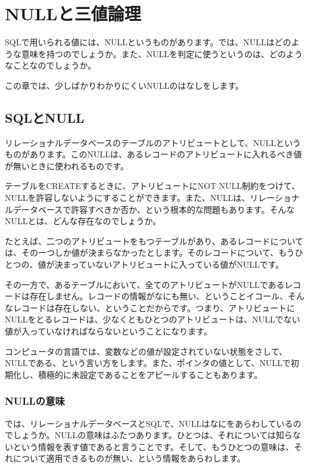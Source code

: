\chapter{NULLと三値論理}

SQLで用いられる値には、NULLというものがあります。では、NULLはどのような意味を持つのでしょうか。また、NULLを判定に使うというのは、どのようなことなのでしょうか。

この章では、少しばかりわかりにくいNULLのはなしをします。

\section{SQLとNULL}

リレーショナルデータベースのテーブルのアトリビュートとして、NULLというものがあります。このNULLは、あるレコードのアトリビュートに入れるべき値が無いときに使われるものです。

テーブルをCREATEするときに、アトリビュートにNOT NULL制約をつけて、NULLを許容しないようにすることができます。また、NULLは、リレーショナルデータベースで許容すべきか否か、という根本的な問題もあります。そんなNULLとは、どんな存在なのでしょうか。

たとえば、二つのアトリビュートをもつテーブルがあり、あるレコードについては、その一つしか値が決まらなかったとします。そのレコードについて、もうひとつの、値が決まっていないアトリビュートに入っている値がNULLです。

その一方で、あるテーブルにおいて、全てのアトリビュートがNULLであるレコードは存在しません。レコードの情報がなにも無い、ということイコール、そんなレコードは存在しない、ということだからです。つまり、アトリビュートにNULLをとるレコードは、少なくともひとつのアトリビュートは、NULLでない値が入っていなければならないということになります。

コンピュータの言語では、変数などの値が設定されていない状態をさして、NULLである、という言い方をします。また、ポインタの値として、NULLで初期化し、積極的に未設定であることをアピールすることもあります。




\subsection{NULLの意味}

では、リレーショナルデータベースとSQLで、NULLはなにをあらわしているのでしょうか。NULLの意味はふたつあります。ひとつは、それについては知らないという情報を表す値であると言うことです。そして、もうひとつの意味は、それについて適用できるものが無い、という情報をあらわします。

